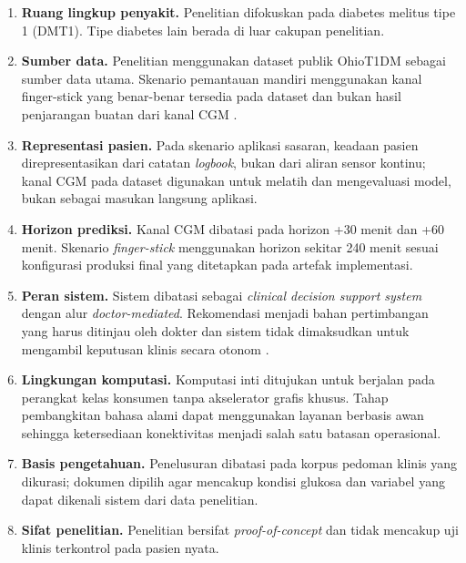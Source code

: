 \begin{enumerate}
    \item \textbf{Ruang lingkup penyakit.} Penelitian difokuskan pada diabetes melitus tipe 1 (DMT1). Tipe diabetes lain berada di luar cakupan penelitian.

    \item \textbf{Sumber data.} Penelitian menggunakan dataset publik OhioT1DM sebagai sumber data utama. Skenario pemantauan mandiri menggunakan kanal finger-stick 
    yang benar-benar tersedia pada dataset dan bukan hasil penjarangan buatan dari kanal CGM \parencite{marling2020}.

    \item \textbf{Representasi pasien.} Pada skenario aplikasi sasaran, keadaan pasien direpresentasikan dari catatan \textit{logbook}, bukan dari aliran sensor kontinu; kanal CGM
    pada dataset digunakan untuk melatih dan mengevaluasi model, bukan sebagai masukan langsung aplikasi.

    \item \textbf{Horizon prediksi.} Kanal CGM dibatasi pada horizon +30 menit dan +60 menit. Skenario \textit{finger-stick} menggunakan horizon sekitar 240 menit sesuai konfigurasi produksi final
    yang ditetapkan pada artefak implementasi.

    \item \textbf{Peran sistem.} Sistem dibatasi sebagai \textit{clinical decision support system} dengan alur \textit{doctor-mediated}. Rekomendasi menjadi bahan pertimbangan
     yang harus ditinjau oleh dokter dan sistem tidak dimaksudkan untuk mengambil keputusan klinis secara otonom \parencite{sutton2020}.

    \item \textbf{Lingkungan komputasi.} Komputasi inti ditujukan untuk berjalan pada perangkat kelas konsumen tanpa akselerator grafis khusus. Tahap pembangkitan bahasa alami 
    dapat menggunakan layanan berbasis awan sehingga ketersediaan konektivitas menjadi salah satu batasan operasional.

    \item \textbf{Basis pengetahuan.} Penelusuran dibatasi pada korpus pedoman klinis yang dikurasi; dokumen dipilih agar mencakup kondisi glukosa dan variabel yang
    dapat dikenali sistem dari data penelitian.

    \item \textbf{Sifat penelitian.} Penelitian bersifat \textit{proof-of-concept} dan tidak mencakup uji klinis terkontrol pada pasien nyata.


\end{enumerate}
